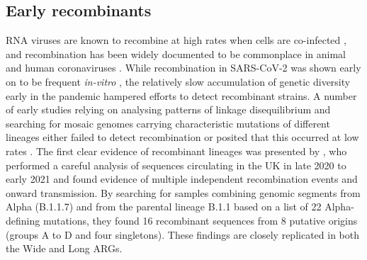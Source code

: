 \documentclass{article}
\begin{document}
\subsection{Early recombinants}
\label{sec:jackson_recombs}
RNA viruses are known to recombine at high rates when cells are co-infected
\citep{Simon2011-rna}, and recombination has been widely
documented to be commonplace in animal and human coronaviruses
\citep{Su2016-epidemiology}. While recombination in SARS-CoV-2
was shown early on to be frequent \emph{in-vitro}
\citep{Gribble2021-coronavirus}, the relatively slow accumulation
of genetic diversity early in the pandemic hampered efforts to
detect recombinant strains. A number of early studies relying on
analysing patterns of linkage disequilibrium and searching for
mosaic genomes carrying characteristic mutations of different
lineages either failed to detect recombination or posited
that this occurred at low rates \citep[e.g.,~][]{Nie2020-phylogenetic,Tang2020-origin,VanInsberghe2021-eu,Varabyou2021-rw}.
The first clear evidence of recombinant lineages was presented by
\citet{Jackson2021-ik}, who performed a careful analysis of sequences
circulating in the UK in late 2020 to early 2021 and found
evidence of multiple independent recombination events and onward
transmission.
By searching for samples combining genomic segments from Alpha (B.1.1.7) and
from the parental lineage B.1.1 based on a list of 22 Alpha-defining mutations,
they found 16 recombinant sequences from 8 putative
origins (groups A to D and four singletons).
These findings are closely replicated in both the Wide and Long ARGs.
\end{document}
